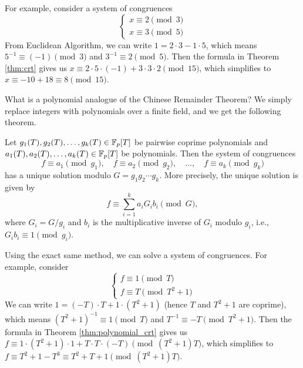 For example, consider a system of congruences
\[
\begin{cases}
    x \equiv 2 \pmod{3} \\
    x \equiv 3 \pmod{5}
\end{cases}
\]
From Euclidean Algorithm, we can write $1 = 2 \cdot 3 - 1 \cdot 5$, which means $5^{-1} \equiv (-1) \pmod{3}$ and $3^{-1} \equiv 2 \pmod{5}$.
Then the formula in Theorem \ref{thm:crt} gives us $x \equiv 2 \cdot 5 \cdot (-1) + 3 \cdot 3 \cdot 2 \pmod{15}$, which simplifies to $x \equiv -10 + 18 \equiv 8 \pmod{15}$.

What is a polynomial analogue of the Chinese Remainder Theorem?
We simply replace integers with polynomials over a finite field, and we get the following theorem.
\begin{theorem}
    \label{thm:polynomial_crt}
    Let $g_1(T), g_2(T), \ldots, g_k(T) \in \mathbb{F}_p[T]$ be pairwise coprime polynomials and $a_1(T), a_2(T), \ldots, a_k(T) \in \mathbb{F}_p[T]$ be polynomials.
    Then the system of congruences
    \[
        f \equiv a_1 \pmod{g_1}, \quad f \equiv a_2 \pmod{g_2}, \quad \ldots, \quad f \equiv a_k \pmod{g_k}
    \]
    has a unique solution modulo $G = g_1 g_2 \cdots g_k$.
    More precisely, the unique solution is given by
    \[
        f \equiv \sum_{i=1}^k a_i G_i b_i \pmod{G},
    \]
    where $G_i = G / g_i$ and $b_i$ is the multiplicative inverse of $G_i$ modulo $g_i$, i.e., $G_i b_i \equiv 1 \pmod{g_i}$.
\end{theorem}

Using the exact same method, we can solve a system of congruences.
For example, consider
\[
\begin{cases}
    f \equiv 1 \pmod{T} \\
    f \equiv T \pmod{T^2 + 1}
\end{cases}
\]
We can write $1 = (-T) \cdot T + 1 \cdot (T^2 + 1)$ (hence $T$ and $T^2 + 1$ are coprime), which means $(T^2 + 1)^{-1} \equiv 1 \pmod{T}$ and $T^{-1} \equiv -T \pmod{T^2 + 1}$.
Then the formula in Theorem \ref{thm:polynomial_crt} gives us $f \equiv 1 \cdot (T^2 + 1) \cdot 1 + T \cdot T \cdot (-T) \pmod{(T^2 + 1)T}$, which simplifies to $f \equiv T^2 + 1 - T^3 \equiv T^2 + T + 1 \pmod{(T^2 + 1)T}$.

